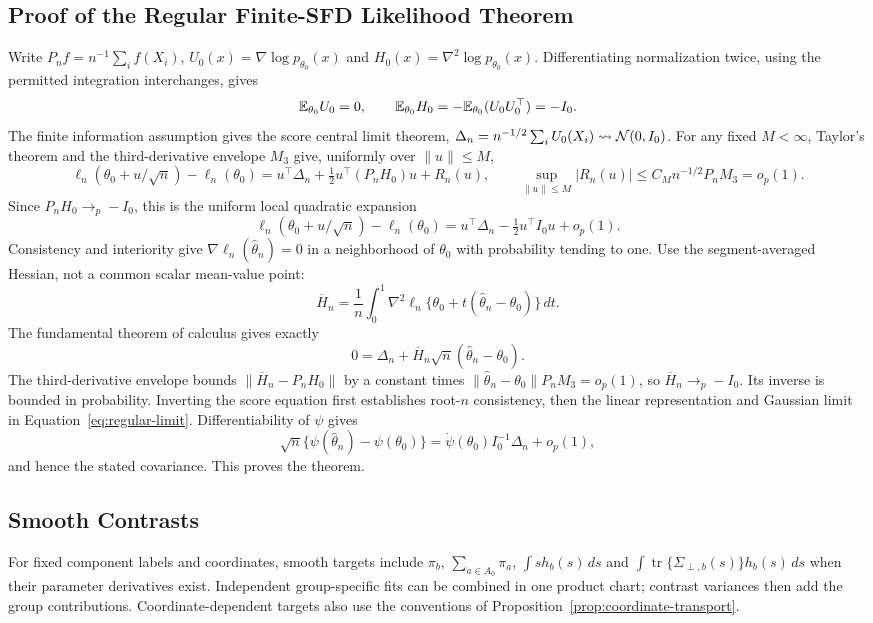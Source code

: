 \subsection{Proof of the Regular Finite-SFD Likelihood Theorem}
Write $P_nf=n^{-1}\sum_i f(X_i)$,
$U_0(x)=\nabla\log p_{\theta_0}(x)$ and
$H_0(x)=\nabla^2\log p_{\theta_0}(x)$. Differentiating normalization twice,
using the permitted integration interchanges, gives
\[
 \mathbb E_{\theta_0}U_0=0,\qquad
 \mathbb E_{\theta_0}H_0=-\mathbb E_{\theta_0}(U_0U_0^\top)=-I_0.
\]
The finite information assumption gives the score central limit theorem,
$\Delta_n=n^{-1/2}\sum_iU_0(X_i)\rightsquigarrow\mathcal N(0,I_0)$.
For any fixed $M<\infty$, Taylor's theorem and the third-derivative envelope
$M_3$ give, uniformly over $\|u\|\le M$,
\[
 \ell_n(\theta_0+u/\sqrt n)-\ell_n(\theta_0)
 =u^\top\Delta_n+\tfrac12u^\top(P_nH_0)u+R_n(u),
 \qquad \sup_{\|u\|\le M}|R_n(u)|
       \le C_Mn^{-1/2}P_nM_3=o_p(1).
\]
Since $P_nH_0\to_p-I_0$, this is the uniform local quadratic expansion
\begin{equation}
 \ell_n(\theta_0+u/\sqrt n)-\ell_n(\theta_0)
       =u^\top\Delta_n-\tfrac12u^\top I_0u+o_p(1).
 \label{eq:local-quadratic}
\end{equation}
Consistency and interiority give $\nabla\ell_n(\hat\theta_n)=0$ in a
neighborhood of $\theta_0$ with probability tending to one. Use the
segment-averaged Hessian, not a common scalar mean-value point:
\[
 \overline H_n=\frac1n\int_0^1
   \nabla^2\ell_n\{\theta_0+t(\hat\theta_n-\theta_0)\}\,dt.
\]
The fundamental theorem of calculus gives exactly
\[
 0=\Delta_n+\overline H_n\sqrt n(\hat\theta_n-\theta_0).
\]
The third-derivative envelope bounds
$\|\overline H_n-P_nH_0\|$ by a constant times
$\|\hat\theta_n-\theta_0\|P_nM_3=o_p(1)$, so
$\overline H_n\to_p-I_0$. Its inverse is bounded in probability.
Inverting the score equation first establishes root-$n$ consistency, then
the linear representation and Gaussian limit in
Equation~\ref{eq:regular-limit}. Differentiability of $\psi$ gives
\[
 \sqrt n\{\psi(\hat\theta_n)-\psi(\theta_0)\}
 =\dot\psi(\theta_0)I_0^{-1}\Delta_n+o_p(1),
\]
and hence the stated covariance. This proves the theorem.

\subsection{Smooth Contrasts}
For fixed component labels and coordinates, smooth targets include
$\pi_b$, $\sum_{a\in A_0}\pi_a$, $\int sh_b(s)\,ds$ and
$\int\operatorname{tr}\{\Sigma_{\perp,b}(s)\}h_b(s)\,ds$ when their
parameter derivatives exist. Independent group-specific fits can be combined
in one product chart; contrast variances then add the group contributions.
Coordinate-dependent targets also use the conventions of
Proposition~\ref{prop:coordinate-transport}.

